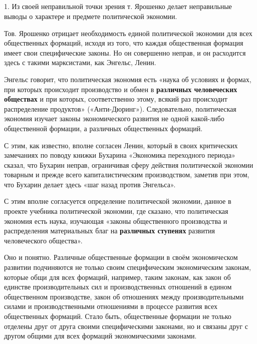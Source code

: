 \documentclass[12pt, a4paper, openany]{book}
\begin{document}
\subsection[II. Другие ошибки тов. Ярошенко]{}



1. Из своей неправильной точки зрения т. Ярошенко делает неправильные выводы о характере и предмете политической экономии.



Тов. Ярошенко отрицает необходимость единой политической экономии для всех общественных формаций, исходя из того, что каждая общественная формация имеет свои специфические законы. Но он совершенно неправ, и он расходится здесь с такими марксистами, как Энгельс, Ленин.



Энгельс говорит, что политическая экономия есть «наука об условиях и формах, при которых происходит производство и обмен в \textbf{различных человеческих обществах} и при которых, соответственно этому, всякий раз происходит распределение продуктов» («Анти-Дюринг»). Следовательно, политическая экономия изучает законы экономического развития не одной какой-либо общественной формации, а различных общественных формаций.



С этим, как известно, вполне согласен Ленин, который в своих критических замечаниях по поводу книжки Бухарина «Экономика переходного периода» сказал, что Бухарин неправ, ограничивая сферу действия политической экономии товарным и прежде всего капиталистическим производством, заметив при этом, что Бухарин делает здесь «шаг назад против Энгельса».



С этим вполне согласуется определение политической экономии, данное в проекте учебника политической экономии, где сказано, что политическая экономия есть наука, изучающая «законы общественного производства и распределения материальных благ на \textbf{различных ступенях} развития человеческого общества».



Оно и понятно. Различные общественные формации в своём экономическом развитии подчиняются не только своим специфическим экономическим законам, которые общи для всех формаций, например, таким законам, как закон об единстве производительных сил и производственных отношений в едином общественном производстве, закон об отношениях между производительными силами и производственными отношениями в процессе развития всех общественных формаций. Стало быть, общественные формации не только отделены друг от друга своими специфическими законами, но и связаны друг с другом общими для всех формаций экономическими законами.
\end{document}
